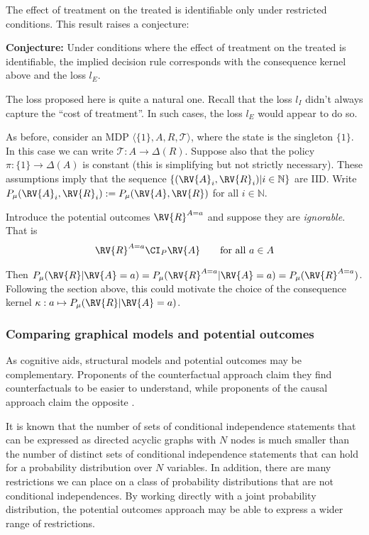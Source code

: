 The effect of treatment on the treated is identifiable only under restricted conditions\cite{angrist_identification_1996,shpitser_effects_2009}. This result raises a conjecture:

\textbf{Conjecture:} Under conditions where the effect of treatment on the treated is identifiable, the implied decision rule corresponds with the consequence kernel above and the loss $l_E$.

The loss proposed here is quite a natural one. Recall that the loss $l_I$ didn't always capture the ``cost of treatment''. In such cases, the loss $l_E$ would appear to do so.

\label{sec:smdp_po}

As before, consider an MDP $\langle \{1\},A,R,\mathcal{T}\rangle$, where the state is the singleton $\{1\}$. In this case we can write $\mathcal{T}:A\to \Delta(R)$. Suppose also that the policy $\pi:\{1\}\to \Delta(A)$ is constant (this is simplifying but not strictly necessary). These assumptions imply that the sequence $\{(\RV{A}_i,\RV{R}_i)|i\in \mathbb{N}\}$ are IID. Write $P_\mu(\RV{A}_i,\RV{R}_i):=P_\mu(\RV{A},\RV{R})$ for all $i\in \mathbb{N}$.

Introduce the potential outcomes $\RV{R}^{A=a}$ and suppose they are \emph{ignorable}\cite{rubin_causal_2005}. That is
\begin{align}
    \RV{R}^{A=a}\CI_P \RV{A}\qquad\text{for all }a\in A 
\end{align}

Then $P_\mu(\RV{R}|\RV{A}=a) = P_\mu(\RV{R}^{A=a}|\RV{A}=a) = P_\mu(\RV{R}^{A=a})$. Following the section above, this could motivate the choice of the consequence kernel $\kappa:a\mapsto P_\mu(\RV{R}|\RV{A}=a)$. 

\subsubsection{Comparing graphical models and potential outcomes}

As cognitive aids, structural models and potential outcomes may be complementary. Proponents of the counterfactual approach claim they find counterfactuals to be easier to understand\cite{rubin_authors_2008,hernan_causal_2018}, while proponents of the causal approach claim the opposite \cite{pearl_causality:_2009}.

It is known that the number of sets of conditional independence statements that can be expressed as directed acyclic graphs with $N$ nodes is much smaller than the number of distinct sets of conditional independence statements that can hold for a probability distribution over $N$ variables\cite{matus_conditional_1995}. In addition, there are many restrictions we can place on a class of probability distributions that are not conditional independences. By working directly with a joint probability distribution, the potential outcomes approach may be able to express a wider range of restrictions.